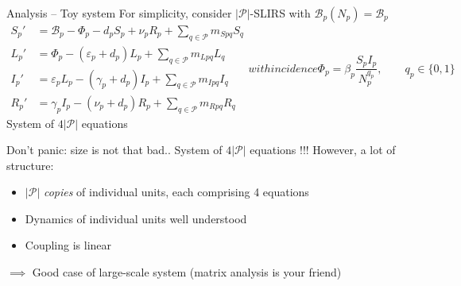 \documentclass[aspectratio=43]{beamer}
\begin{document}
\begin{frame}{Analysis -- Toy system}
For simplicity, consider $|\mathcal{P}|$-SLIRS with $\mathcal{B}_p(N_p)=\mathcal{B}_p$
\begin{subequations}
	\label{sys:pSLIRS_toy}
	\begin{align}
		S_{p}' &=\mathcal{B}_p-\Phi_p-d_pS_p+\nu_pR_p
		+\textstyle{\sum_{q\in\mathcal{P}}} m_{Spq}S_{q} 
		\label{sys:pSLIRS_toy_dS} \\
		L_{p}' &=\Phi_p-\left( \varepsilon_{p}+d_{p}\right)L_{p}
		+\textstyle{\sum_{q\in\mathcal{P}}} m_{Lpq}L_{q} 
		\label{sys:pSLIRS_toy_dL} \\
		I_{p}' &=\varepsilon_pL_p-(\gamma_p+d_p)I_p
		+\textstyle{\sum_{q\in\mathcal{P}}} m_{Ipq}I_{q} 
		\label{sys:pSLIRS_toy_dI} \\
		R_{p}' &=\gamma _{p}I_{p}-\left(\nu_{p}+d_{p}\right)R_{p}
		+\textstyle{\sum_{q\in\mathcal{P}}} m_{Rpq}R_{q}
		\label{sys:pSLIRS_toy_dR} 
	\end{align}
	with incidence
	\begin{equation}
		\Phi_p=\beta_p\frac{S_pI_p}{N_p^{q_p}},\qquad q_p\in\{0,1\}
		\label{sys:pSLIRS_toy_incidence} 
	\end{equation}			
\end{subequations}
\vfill
System of $4|\mathcal{P}|$ equations
\end{frame}

\begin{frame}{Don't panic: size is not that bad..}
System of $4|\mathcal{P}|$ equations !!!
\vfill
However, a lot of structure: 
\begin{itemize}
	\item $|\mathcal{P}|$ \emph{copies} of individual units, each comprising 4 equations
	\item Dynamics of individual units well understood
	\item Coupling is linear
\end{itemize}
\vfill
$\implies$ Good case of large-scale system
\vfill
(matrix analysis is your friend)

\end{frame}



\end{document}
